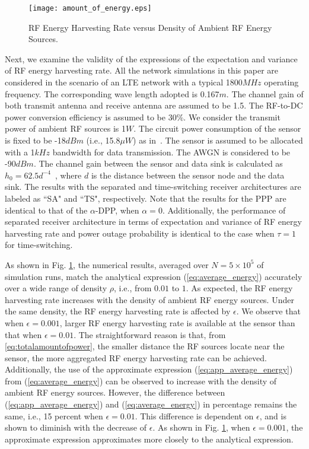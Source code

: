 \documentclass[12pt,draftclsnofoot,onecolumn]{IEEEtran}
\begin{document}
\begin{figure}
\centering
\texttt{[image: amount\_of\_energy.eps]}
\caption{RF Energy Harvesting Rate versus Density of Ambient RF Energy Sources. } \label{fig:amount_of_energy}
\end{figure}


Next, we examine the validity of the expressions of the expectation and variance of RF energy harvesting rate. All the network simulations in this paper are considered in the scenario of an LTE network with a typical 1800$MHz$ operating frequency. The corresponding wave length adopted is 0.167$m$. 
The channel gain of both transmit antenna and receive antenna are assumed to be 1.5. The RF-to-DC power conversion efficiency is assumed to be 30$\%$. We consider the transmit power of ambient RF sources is 1$W$. The circuit power consumption of the sensor is fixed to be -18$dBm$ (i.e., 15.8$\mu W$) as in~\cite{N.2013Parks}.
The sensor is assumed to be allocated with a 1$kHz$ bandwidth for data transmission. The AWGN is considered to be -90$dBm$.
The channel gain between the sensor and data sink is calculated as $h_{0}=62.5d^{-4}$~\cite{2014X.Lu}, where $d$ is the distance between the sensor node and the data sink. The results with the separated and time-switching receiver architectures are labeled as ``SA" and ``TS", respectively. Note that the results for the PPP are identical to that of the $\alpha$-DPP, when $\alpha=0$. Additionally, the performance of separated receiver architecture in terms of expectation and variance of RF energy harvesting rate and power outage probability is identical to the case when $\tau=1$ for time-switching. 

As shown in Fig. \ref{fig:amount_of_energy}, the numerical results, averaged over $N=5\times 10^5$ of simulation runs, match the analytical expression (\ref{eq:average_energy}) accurately over a wide range of density $\rho$, i.e., from $0.01$ to $1$. As expected, the RF energy harvesting rate increases with the density of ambient RF energy sources. Under the same density, the RF energy harvesting rate is affected by $\epsilon$. We observe that when $\epsilon=0.001$, larger RF energy harvesting rate is available at the sensor than that when $\epsilon=0.01$. The straightforward reason is that, from \eqref{eq:totalamountofpower}, the smaller distance the RF sources locate near the sensor, the more aggregated RF energy harvesting rate can be achieved. Additionally, the use of the approximate expression (\ref{eq:app_average_energy}) from (\ref{eq:average_energy}) can be observed to increase with the density of ambient RF energy sources. However, the difference between (\ref{eq:app_average_energy}) and (\ref{eq:average_energy}) in percentage remains the same, i.e., 15 percent when $\epsilon=0.01$. This difference is dependent on $\epsilon$, and is shown to diminish with the decrease of $\epsilon$. As shown in Fig. \ref{fig:amount_of_energy}, when $\epsilon=0.001$, the approximate expression approximates more closely to the analytical expression.  
\end{document}
